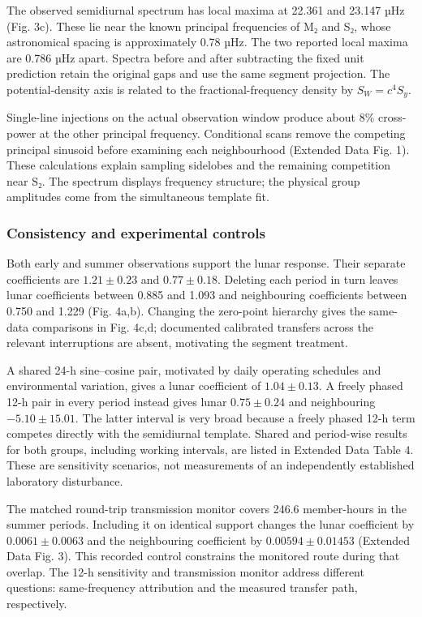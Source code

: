 \documentclass[
  12pt,
  a4paper,
]{article}
\begin{document}
The observed semidiurnal spectrum has local maxima at 22.361 and 23.147
µHz (Fig. 3c). These lie near the known principal frequencies of M₂ and
S₂, whose astronomical spacing is approximately 0.78 µHz. The two
reported local maxima are 0.786 µHz apart. Spectra before and after
subtracting the fixed unit prediction retain the original gaps and use
the same segment projection. The potential-density axis is related to
the fractional-frequency density by \(S_W=c^4S_y\).

Single-line injections on the actual observation window produce about
8\% cross-power at the other principal frequency. Conditional scans
remove the competing principal sinusoid before examining each
neighbourhood (Extended Data Fig. 1). These calculations explain
sampling sidelobes and the remaining competition near S₂. The spectrum
displays frequency structure; the physical group amplitudes come from
the simultaneous template fit.

\hypertarget{consistency-and-experimental-controls}{%
\subsubsection{Consistency and experimental
controls}\label{consistency-and-experimental-controls}}

Both early and summer observations support the lunar response. Their
separate coefficients are \(1.21\pm0.23\) and \(0.77\pm0.18\). Deleting
each period in turn leaves lunar coefficients between 0.885 and 1.093
and neighbouring coefficients between 0.750 and 1.229 (Fig. 4a,b).
Changing the zero-point hierarchy gives the same-data comparisons in
Fig. 4c,d; documented calibrated transfers across the relevant
interruptions are absent, motivating the segment treatment.

A shared 24-h sine--cosine pair, motivated by daily operating schedules
and environmental variation, gives a lunar coefficient of
\(1.04\pm0.13\). A freely phased 12-h pair in every period instead gives
lunar \(0.75\pm0.24\) and neighbouring \(-5.10\pm15.01\). The latter
interval is very broad because a freely phased 12-h term competes
directly with the semidiurnal template. Shared and period-wise results
for both groups, including working intervals, are listed in Extended
Data Table 4. These are sensitivity scenarios, not measurements of an
independently established laboratory disturbance.

The matched round-trip transmission monitor covers 246.6 member-hours in
the summer periods. Including it on identical support changes the lunar
coefficient by \(0.0061\pm0.0063\) and the neighbouring coefficient by
\(0.00594\pm0.01453\) (Extended Data Fig. 3). This recorded control
constrains the monitored route during that overlap. The 12-h sensitivity
and transmission monitor address different questions: same-frequency
attribution and the measured transfer path, respectively.
\end{document}
